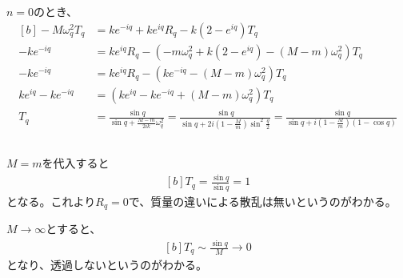 \documentclass[../ap_2022.tex]{subfiles}
\begin{document}
\(n=0\)のとき、
\begin{equation}\begin{aligned}[b]
    -M\omega_q^2T_q &= ke^{-iq}+ke^{iq}R_q-k(2-e^{iq})T_q\\
    -ke^{-iq} &= ke^{iq}R_q-(-m\omega_q^2+k(2-e^{iq})-(M-m)\omega_q^2)T_q\\
    -ke^{-iq} &= ke^{iq}R_q-(ke^{-iq}-(M-m)\omega_q^2)T_q\\
    ke^{iq}-ke^{-iq} &= (ke^{iq}-ke^{-iq}+(M-m)\omega_q^2)T_q\\
    T_q &= \frac{\sin q}{\sin q+\frac{M-m}{2ik}\omega^2_q}
    = \frac{\sin q}{\sin q +2i(1-\frac{M}{m})\sin^2\frac{q}{2}}
    = \frac{\sin q}{\sin q +i(1-\frac{M}{m})(1-\cos q)}
\end{aligned}\end{equation}

\subsection{}
\(M=m\)を代入すると
\begin{equation}\begin{aligned}[b]
    T_q=\frac{\sin q}{\sin q}=1
\end{aligned}\end{equation}
となる。これより\(R_q=0\)で、質量の違いによる散乱は無いというのがわかる。

\(M\to\infty\)とすると、
\begin{equation}\begin{aligned}[b]
    T_q \sim \frac{\sin q}{M}\to 0
\end{aligned}\end{equation}
となり、透過しないというのがわかる。

\section{}
\end{document}
